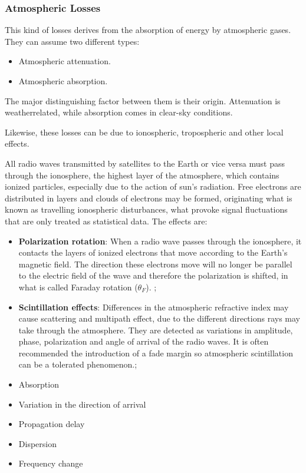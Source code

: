 \subsubsection{Atmospheric Losses}
This kind of losses derives from the absorption of energy by atmospheric gases. They can assume two different types:

\begin{itemize}
	\item Atmospheric attenuation.
	\item Atmospheric absorption.
\end{itemize}

The major distinguishing factor between them is their origin. Attenuation is weatherrelated, while absorption comes in clear-sky conditions.

Likewise, these losses can be due to ionospheric, tropospheric and other local effects. \cite{Jorge2012}

All radio waves transmitted by satellites to the Earth or vice versa must pass through the ionosphere, the highest layer of the atmosphere, which contains ionized particles, especially due to the action of sun’s radiation. Free electrons are distributed in layers and clouds of electrons may be formed, originating what is known as travelling ionospheric disturbances, what provoke signal fluctuations that are only treated as statistical data. The effects are:

\begin{itemize}
	\item \textbf{Polarization rotation}: When a radio wave passes through the ionosphere, it contacts the layers of ionized 	electrons that move according to the Earth’s magnetic field. The direction these 	electrons move will no longer be parallel to the electric field of the wave and therefore	the polarization is shifted, in what is called Faraday rotation ($\theta_F$). ;
	\item \textbf{Scintillation effects}: Differences in the atmospheric refractive index may cause scattering and multipath 	effect, due to the different directions rays may take through the atmosphere. They are detected as variations in amplitude, phase, polarization and angle of arrival of	the radio waves.	It is often recommended the introduction of a fade margin so atmospheric scintillation
	can be a tolerated phenomenon.; 
	\item Absorption
	\item Variation in the direction of arrival
	\item Propagation delay
	\item Dispersion
	\item Frequency change
\end{itemize}

